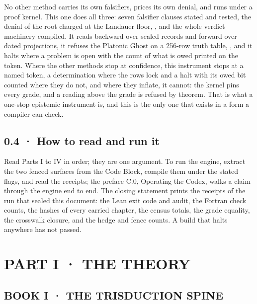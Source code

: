 \documentclass[10pt,twocolumn]{article}
\begin{document}
No other method carries its own falsifiers, prices its own denial, and
runs under a proof kernel. This one does all three: seven falsifier
clauses stated and tested, the denial of the root charged at the
Landauer floor, \texttt{}, and the
whole verdict machinery compiled. It reads backward over sealed records
and forward over dated projections, it refuses the Platonic Ghost on a
256-row truth table,
\texttt{},
and it halts where a problem is open with the count of what is owed
printed on the token. Where the other methods stop at confidence, this
instrument stops at a named token, a determination where the rows lock
and a halt with its owed bit counted where they do not, and where they
inflate, it cannot: the kernel pins every grade, and a reading above the
grade is refused by theorem. That is what a one-stop epistemic
instrument is, and this is the only one that exists in a form a compiler
can check.

\hypertarget{how-to-read-and-run-it}{%
\subsection{0.4 · How to read and run it}\label{how-to-read-and-run-it}}

Read Parts I to IV in order; they are one argument. To run the engine,
extract the two fenced surfaces from the Code Block, compile them under
the stated flags, and read the receipts; the preface C.0, Operating the
Codex, walks a claim through the engine end to end. The closing
statement prints the receipts of the run that sealed this document: the
Lean exit code and audit, the Fortran check counts, the hashes of every
carried chapter, the census totals, the grade equality, the crosswalk
closure, and the hedge and fence counts. A build that halts anywhere has
not passed.

\hypertarget{part-i-the-theory}{%
\section{PART I · THE THEORY}\label{part-i-the-theory}}

\hypertarget{book-i-the-trisduction-spine}{%
\subsection{BOOK I · THE TRISDUCTION
SPINE}\label{book-i-the-trisduction-spine}}
\end{document}
